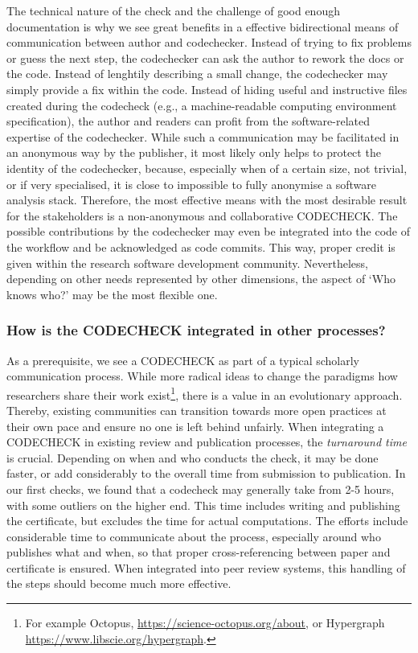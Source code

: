 \documentclass[12pt]{article}
\begin{document}
The technical nature of the check and the challenge of good enough 
documentation is why we see great benefits in a effective bidirectional
means of communication between author and codechecker. Instead of trying to
fix problems or guess the next step, the codechecker can ask the author to 
rework the docs  or the code.
Instead of lenghtily describing a small change, the codechecker may simply
provide a fix within the code.
Instead of hiding useful and  instructive files created during the codecheck
(e.g., a machine-readable computing environment specification), the author 
and readers can profit from the software-related expertise of the
codechecker.
While such a communication may be facilitated in an anonymous way by the 
publisher, it most likely only helps to protect the identity of the 
codechecker, because, especially when of a certain size, not trivial, or 
if very specialised, it is close to impossible to fully anonymise a 
software analysis stack.
Therefore, the most effective means with the most desirable result for
the stakeholders is a non-anonymous and collaborative CODECHECK.
The possible contributions by the codechecker may even be integrated into
the code of the workflow and be acknowledged as code commits. This way, 
proper credit is given within the research software development community.
Nevertheless, depending on other needs represented by other dimensions,
the aspect of `Who knows who?' may be the most flexible one.

\subsubsection*{How is the CODECHECK integrated in other processes?}\label{turnaround-time}

As a prerequisite, we see a CODECHECK as part of a typical scholarly
communication process. While more radical ideas to change the paradigms
how researchers share their work exist\footnote{For example Octopus, 
\url{https://science-octopus.org/about}, or Hypergraph
\url{https://www.libscie.org/hypergraph}.}, there is a 
value in an evolutionary approach. Thereby, existing communities can 
transition towards more open practices at their own pace and ensure
no one is left behind unfairly.
When integrating a CODECHECK in existing review and publication processes,
the \emph{turnaround time} is crucial. Depending on when and who conducts
the check, it may be done faster, or add considerably to the overall
time from submission to publication.
In our first checks, we found that a codecheck may generally take from 2-5
hours, with some outliers on the higher end. This time includes writing and
publishing the certificate, but excludes the time for actual computations.
The efforts include considerable time to communicate about the process, 
especially around who publishes what and when, so that proper 
cross-referencing between paper and certificate is ensured.
When integrated into peer review systems, this handling of the steps should
become much more effective.
\end{document}
